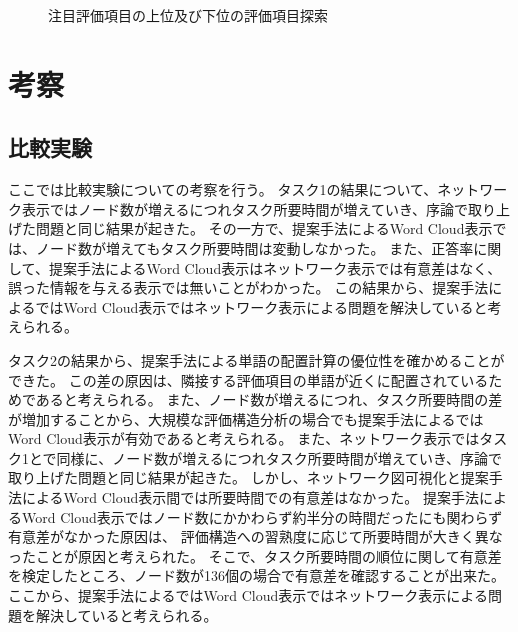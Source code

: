 \documentclass[syuuron]{kuee}
\begin{document}
		\begin{figure}
			\begin{center}
			\end{center}
			\caption{注目評価項目の上位及び下位の評価項目探索}
	  		\label{fig:cas2}
		\end{figure}
			
\chapter{考察}
	\section{比較実験}
	ここでは比較実験についての考察を行う。
	タスク1の結果について、ネットワーク表示ではノード数が増えるにつれタスク所要時間が増えていき、序論で取り上げた問題と同じ結果が起きた。
	その一方で、提案手法によるWord Cloud表示では、ノード数が増えてもタスク所要時間は変動しなかった。
	また、正答率に関して、提案手法によるWord Cloud表示はネットワーク表示では有意差はなく、誤った情報を与える表示では無いことがわかった。
	この結果から、提案手法によるではWord Cloud表示ではネットワーク表示による問題を解決していると考えられる。
	
	タスク2の結果から、提案手法による単語の配置計算の優位性を確かめることができた。
	この差の原因は、隣接する評価項目の単語が近くに配置されているためであると考えられる。
	また、ノード数が増えるにつれ、タスク所要時間の差が増加することから、大規模な評価構造分析の場合でも提案手法によるではWord Cloud表示が有効であると考えられる。
	また、ネットワーク表示ではタスク1とで同様に、ノード数が増えるにつれタスク所要時間が増えていき、序論で取り上げた問題と同じ結果が起きた。
	しかし、ネットワーク図可視化と提案手法によるWord Cloud表示間では所要時間での有意差はなかった。
	提案手法によるWord Cloud表示ではノード数にかかわらず約半分の時間だったにも関わらず有意差がなかった原因は、
	評価構造への習熟度に応じて所要時間が大きく異なったことが原因と考えられた。
	そこで、タスク所要時間の順位に関して有意差を検定したところ、ノード数が136個の場合で有意差を確認することが出来た。
	ここから、提案手法によるではWord Cloud表示ではネットワーク表示による問題を解決していると考えられる。
	
\end{document}
